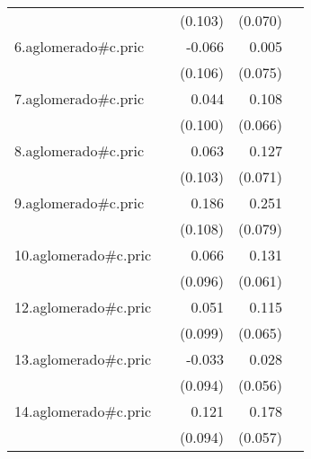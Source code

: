 {\begin{longtable}{l*{4}{D{.}{.}{-1}}}
            &                     &     (0.103)         &     (0.070)         &                     \\
\addlinespace
6.aglomerado#c.pric&                     &      -0.066         &       0.005         &                     \\
            &                     &     (0.106)         &     (0.075)         &                     \\
\addlinespace
7.aglomerado#c.pric&                     &       0.044         &       0.108         &                     \\
            &                     &     (0.100)         &     (0.066)         &                     \\
\addlinespace
8.aglomerado#c.pric&                     &       0.063         &       0.127         &                     \\
            &                     &     (0.103)         &     (0.071)         &                     \\
\addlinespace
9.aglomerado#c.pric&                     &       0.186         &       0.251\sym{**} &                     \\
            &                     &     (0.108)         &     (0.079)         &                     \\
\addlinespace
10.aglomerado#c.pric&                     &       0.066         &       0.131\sym{*}  &                     \\
            &                     &     (0.096)         &     (0.061)         &                     \\
\addlinespace
12.aglomerado#c.pric&                     &       0.051         &       0.115         &                     \\
            &                     &     (0.099)         &     (0.065)         &                     \\
\addlinespace
13.aglomerado#c.pric&                     &      -0.033         &       0.028         &                     \\
            &                     &     (0.094)         &     (0.056)         &                     \\
\addlinespace
14.aglomerado#c.pric&                     &       0.121         &       0.178\sym{**} &                     \\
            &                     &     (0.094)         &     (0.057)         &                     \\

\end{longtable}}
